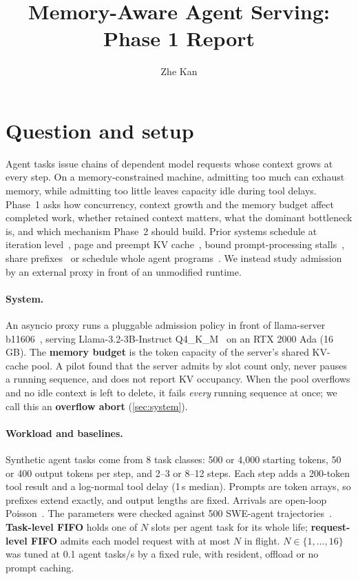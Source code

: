 \documentclass[10pt,twocolumn]{article}
\title{\vspace{-1.2em}Memory-Aware Agent Serving: Phase 1 Report\vspace{-0.6em}}
\author{Zhe Kan \quad {\normalsize CSE 291A, Fall 2026, Option 1}}
\date{\vspace{-1.6em}}
\begin{document}
\maketitle

\section{Question and setup}\label{main:setup}

Agent tasks issue chains of dependent model requests whose context grows at every step. On a memory-constrained machine, admitting too much can exhaust memory, while admitting too little leaves capacity idle during tool delays. Phase~1 asks how concurrency, context growth and the memory budget affect completed work, whether retained context matters, what the dominant bottleneck is, and which mechanism Phase~2 should build. Prior systems schedule at iteration level~\cite{yu2022orca}, page and preempt KV cache~\cite{kwon2023pagedattention}, bound prompt-processing stalls~\cite{agrawal2024sarathi}, share prefixes~\cite{zheng2024sglang} or schedule whole agent programs~\cite{luo2026agentix}. We instead study admission by an external proxy in front of an unmodified runtime.

\paragraph{System.} An asyncio proxy runs a pluggable admission policy in front of llama-server b11606~\cite{llamacpp}, serving Llama-3.2-3B-Instruct Q4\_K\_M~\cite{meta2024llama32,bartowski2024gguf} on an RTX 2000 Ada (16\,GB). The \textbf{memory budget} is the token capacity of the server's shared KV-cache pool. A pilot found that the server admits by slot count only, never pauses a running sequence, and does not report KV occupancy. When the pool overflows and no idle context is left to delete, it fails \emph{every} running sequence at once; we call this an \textbf{overflow abort} (\cref{sec:system}).

\paragraph{Workload and baselines.} Synthetic agent tasks come from 8 task classes: 500 or 4,000 starting tokens, 50 or 400 output tokens per step, and 2--3 or 8--12 steps. Each step adds a 200-token tool result and a log-normal tool delay (1\,s median). Prompts are token arrays, so prefixes extend exactly, and output lengths are fixed. Arrivals are open-loop Poisson~\cite{schroeder2006open}. The parameters were checked against 500 SWE-agent trajectories~\cite{yang2024sweagent,nebius2024trajectories}. \textbf{Task-level FIFO} holds one of $N$ slots per agent task for its whole life; \textbf{request-level FIFO} admits each model request with at most $N$ in flight. $N\in\{1,\dots,16\}$ was tuned at 0.1 agent tasks/s by a fixed rule, with resident, offload or no prompt caching.
\end{document}

